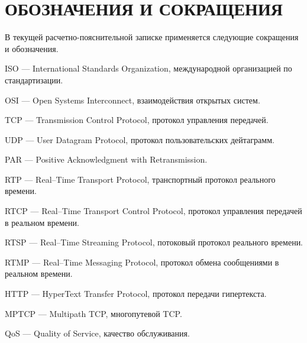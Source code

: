\chapter*{ОБОЗНАЧЕНИЯ И СОКРАЩЕНИЯ}

В текущей расчетно-пояснительной записке применяется следующие сокращения и обозначения.

\begin{description}[leftmargin=0pt]
	\item \noindent ISO --- International Standards Organization, международной организацией по стандартизации.
	\item \noindent OSI --- Open Systems Interconnect, взаимодействия открытых систем.
	\item \noindent TCP --- Transmission Control Protocol,  протокол управления передачей.
	\item \noindent UDP --- User Datagram Protocol, протокол пользовательских дейтаграмм.
	\item \noindent PAR --- Positive Acknowledgment with Retransmission.
	\item \noindent RTP --- Real--Time Transport Protocol, транспортный протокол реального времени.
	\item \noindent RTCP --- Real--Time Transport Control Protocol, протокол управления передачей в реальном времени.
	\item \noindent RTSP --- Real--Time Streaming Protocol, потоковый протокол реального времени.
	\item \noindent RTMP --- Real--Time Messaging Protocol, протокол обмена сообщениями в реальном времени.
	\item \noindent HTTP --- HyperText Transfer Protocol, протокол передачи гипертекста.
	\item \noindent MPTCP --- Multipath TCP, многопутевой TCP. 
	\item \noindent QoS --- Quality of Service, качество обслуживания.
\end{description}

